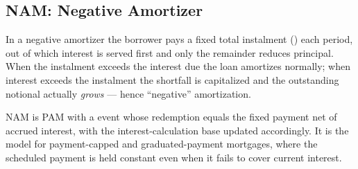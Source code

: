 \subsection{NAM: Negative Amortizer}\label{sec:nam}

In a negative amortizer the borrower pays a fixed total instalment
() each period, out of which interest is served first and only the
remainder reduces principal.  When the instalment exceeds the interest due the
loan amortizes normally; when interest exceeds the instalment the shortfall is
capitalized and the outstanding notional actually \emph{grows} --- hence
``negative'' amortization.

NAM is PAM with a  event whose redemption equals the fixed payment net
of accrued interest, with the interest-calculation base updated accordingly.  It
is the model for payment-capped and graduated-payment mortgages, where the
scheduled payment is held constant even when it fails to cover current
interest.

